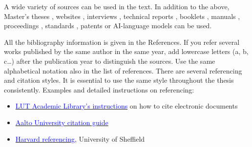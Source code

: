 A wide variety of sources can be used in the text. In addition to the above, Master's theses \citep{Hyv19}, websites \citep{CitekeyMisc}, interviews \citep[interview 6.6.2007]{CitekeyMisc2}, technical reports \citep{Lai09}, booklets \citep{CitekeyBooklet}, manuals \citep{CitekeyManual}, proceedings \citep{CitekeyProceedings}, standards \citep{standardi}, patents \citep{US5503249} or AI-language models \citep{ChatGPT} can be used.

All the bibliography information is given in the References. If you refer several works published by the same author in the same year, add lowercase letters (a, b, c…) after the publication year to distinguish the sources. Use the same alphabetical notation also in the list of references. There are several referencing and citation styles. It is essential to use the same style throughout the thesis consistently. Examples and detailed instructions on referencing:
\begin{itemize}
    \item \href{https://libguides.lut.fi/citingelectronicdocuments}{\textcolor{blue}{LUT Academic Library’s instructions}} on how to cite electronic documents
    \item \href{https://libguides.aalto.fi/citation_guide}{\textcolor{blue}{Aalto University citation guide}}
    \item \href{https://www.librarydevelopment.group.shef.ac.uk/referencing/harvard.html}{\textcolor{blue}{Harvard referencing}}, University of Sheffield 
\end{itemize}

\clearpage %